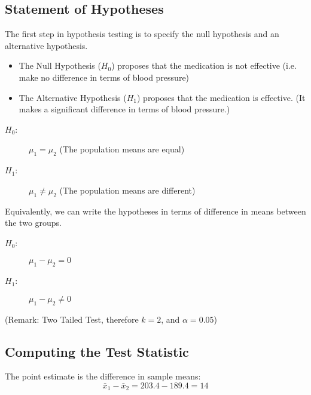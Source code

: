 \documentclass[a4paper,12pt]{article}
\begin{document}
\subsection*{Statement of Hypotheses}
\noindent The first step in hypothesis testing is to specify the null hypothesis and an alternative hypothesis.
\begin{itemize}
    \item The Null Hypothesis ($H_0$) proposes that the medication is not effective (i.e. make no difference in terms of blood pressure)
    \item The Alternative Hypothesis ($H_1$) proposes that the medication is effective. (It makes a significant difference in terms of blood pressure.)
\end{itemize}
\begin{description}
\item[$H_0$:] $\mu_1 = \mu_2$ (The population means are equal)
\item[$H_1$:] $\mu_1 \neq \mu_2$ (The population means are different)
\end{description}

\noindent Equivalently, we can write the hypotheses in terms of difference in means between the two groups.
\begin{description}
\item[$H_0$:] $\mu_1 - \mu_2 = 0$ 
\item[$H_1$:] $\mu_1 - \mu_2\neq  0$ 
\end{description}



\noindent (Remark: Two Tailed Test, therefore $k = 2$, and $\alpha = 0.05$)
\newpage
\subsection*{Computing the Test Statistic}

The point estimate is the difference in sample means:
    \[ \bar{x}_1 - \bar{x}_2 = 203.4- 189.4 = 14\]
    
\end{document}
